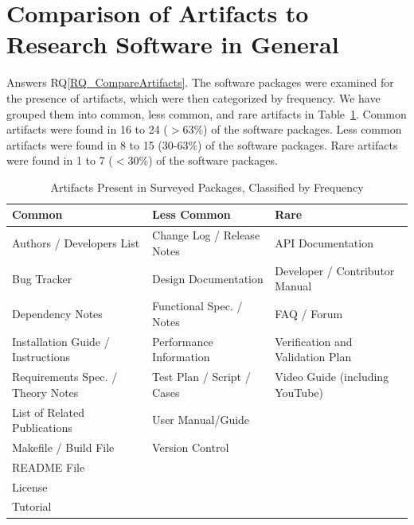 \documentclass[final, 3p, times, authoryear]{elsarticle}
\newcommand{\rqref}[1]{RQ\ref{#1}}
\begin{document}
\section{Comparison of Artifacts to Research Software in General}
\label{Sec_CompareArtifacts}

Answers \rqref{RQ_CompareArtifacts}.  The software packages were examined for
the presence of artifacts, which were then categorized by frequency. We have
grouped them into common, less common, and rare artifacts in
Table~\ref{artifactspresent}. Common artifacts were found in 16 to 24 ($>$63\%)
of the software packages. Less common artifacts were found in 8 to 15 (30-63\%)
of the software packages. Rare artifacts were found in 1 to 7 ($<$30\%) of the
software packages. 

\begin{table}
\begin{center}
\begin{tabular}{ p{5.3 cm} p{4.9 cm} p{5 cm}}
\toprule
\textbf{Common} & \textbf{Less Common} & \textbf{Rare} \\
\midrule
Authors / Developers List & Change Log / Release Notes & API Documentation\\
Bug Tracker & Design Documentation & Developer / Contributor Manual\\
Dependency Notes & Functional Spec. / Notes & FAQ / Forum\\
Installation Guide / Instructions & Performance Information & Verification and
Validation Plan\\
Requirements Spec. / Theory Notes & Test Plan / Script / Cases & Video Guide
(including YouTube)\\
List of Related Publications & User Manual/Guide & \\
Makefile / Build File & Version Control & \\
README File & & \\
License & & \\
Tutorial & & \\
\bottomrule
\end{tabular}
\caption{Artifacts Present in Surveyed Packages, Classified by Frequency}
\label{artifactspresent}
\end{center}
\end{table}
\end{document}
